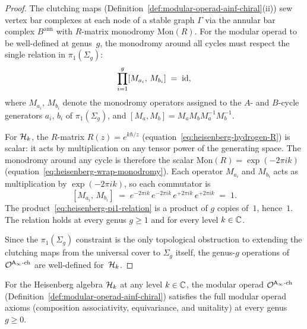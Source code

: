 \begin{proof}
The clutching maps
(Definition~\ref{def:modular-operad-ainf-chiral}(ii))
sew vertex bar complexes at each node of a stable graph
$\Gamma$ via the annular bar complex $B^{\mathrm{ann}}$
with $R$-matrix monodromy $\mathrm{Mon}(R)$.
For the modular operad to be well-defined at genus~$g$,
the monodromy around all cycles must respect the
single relation in $\pi_1(\Sigma_g)$:
\begin{equation}\label{eq:heisenberg-pi1-relation}
\prod_{i=1}^{g}
[M_{a_i},\, M_{b_i}]
\;=\; \mathrm{id},
\end{equation}
where $M_{a_i}$, $M_{b_i}$ denote the monodromy
operators assigned to the $A$- and $B$-cycle generators
$a_i$, $b_i$ of $\pi_1(\Sigma_g)$, and
$[M_a, M_b] = M_a M_b M_a^{-1} M_b^{-1}$.

For $\mathcal{H}_k$, the $R$-matrix
$R(z) = e^{k\hbar/z}$
(equation~\eqref{eq:heisenberg-hydrogen-R})
is scalar: it acts by multiplication on any
tensor power of the generating space.
The monodromy around any cycle is therefore
the scalar
$\mathrm{Mon}(R) = \exp(-2\pi i k)$
(equation~\eqref{eq:heisenberg-wrap-monodromy}).
Each operator $M_{a_i}$ and $M_{b_i}$ acts as
multiplication by $\exp(-2\pi i k)$, so each
commutator is
\[
[M_{a_i},\, M_{b_i}]
\;=\;
e^{-2\pi ik}\, e^{-2\pi ik}\,
e^{+2\pi ik}\, e^{+2\pi ik}
\;=\; 1.
\]
The product~\eqref{eq:heisenberg-pi1-relation}
is a product of $g$ copies of~$1$, hence~$1$.
The relation holds at every genus $g \ge 1$ and for
every level $k \in \mathbb{C}$.

Since the $\pi_1(\Sigma_g)$ constraint is
the only topological obstruction to extending
the clutching maps from the universal cover to
$\Sigma_g$ itself, the genus-$g$ operations of
$\mathcal{O}^{\mathsf{A}_{\infty}\text{-ch}}$ are well-defined
for~$\mathcal{H}_k$.
\end{proof}

\begin{proposition}
\label{prop:heisenberg-full-modular-operad}
For the Heisenberg algebra $\mathcal{H}_k$ at any level
$k \in \mathbb{C}$, the modular operad
$\mathcal{O}^{\mathsf{A}_{\infty}\textup{-ch}}$
\textup{(}Definition~\textup{\ref{def:modular-operad-ainf-chiral}}\textup{)}
satisfies the full modular operad axioms (composition
associativity, equivariance, and unitality) at every
genus $g \ge 0$.
\end{proposition}

